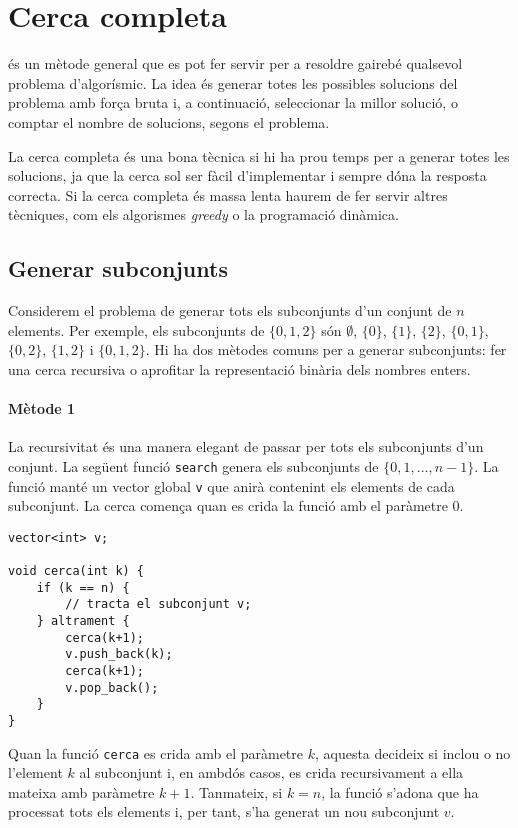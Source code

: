 \chapter{Cerca completa}

és un mètode general que es pot fer servir
per a resoldre gairebé qualsevol problema d'algorísmic.
La idea és generar totes les possibles
solucions del problema amb força bruta
i, a continuació, seleccionar la millor solució, o comptar
el nombre de solucions, segons el problema.

La cerca completa és una bona tècnica
si hi ha prou temps per a generar totes les solucions,
ja que la cerca sol ser fàcil d'implementar
i sempre dóna la resposta correcta.
Si la cerca completa és massa lenta haurem
de fer servir altres tècniques, com els algorismes \emph{greedy}
o la programació dinàmica.

\section{Generar subconjunts}


Considerem el problema de generar
tots els subconjunts d'un conjunt de $n$ elements.
Per exemple, els subconjunts de $\{0,1,2\}$ són
$\emptyset$, $\{0\}$, $\{1\}$, $\{2\}$, $\{0,1\}$,
$\{0,2\}$, $\{1,2\}$ i $\{0,1,2\}$.
Hi ha dos mètodes comuns per a generar subconjunts:
fer una cerca recursiva
o aprofitar la representació binària dels nombres enters.

\subsubsection{Mètode 1}

La recursivitat és una manera elegant de passar per
tots els subconjunts d'un conjunt.
La següent funció \texttt{search}
genera els subconjunts de
$\{0,1,\ldots,n-1\}$.
La funció manté un vector global \texttt{v}
que anirà contenint els elements de cada subconjunt.
La cerca comença quan es crida la funció
amb el paràmetre 0.

\begin{lstlisting}
vector<int> v;

void cerca(int k) {
    if (k == n) {
        // tracta el subconjunt v;
    } altrament {
        cerca(k+1);
        v.push_back(k);
        cerca(k+1);
        v.pop_back();
    }
}
\end{lstlisting}

Quan la funció \texttt{cerca}
es crida amb el paràmetre $k$,
aquesta decideix si inclou o no l'element $k$ al subconjunt
i, en ambdós casos,
es crida recursivament a ella mateixa amb paràmetre $k+1$.
Tanmateix, si $k=n$, la funció s'adona
que ha processat tots els elements
i, per tant, s'ha generat un nou subconjunt $v$.

